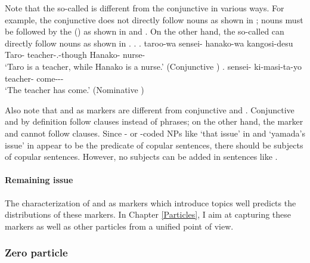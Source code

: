 Note that the so-called   is different from
the conjunctive  in various ways.
For example,
the conjunctive  does not directly follow nouns
as shown in \Last[a];
nouns must be followed by the  () as shown in \Last[a] and \Next[a].
On the other hand,
the so-called   can directly follow nouns
as shown in \Next[b].
%
\ex.
 \ag. taroo-wa sensei- hanako-wa kangosi-desu \\
      Taro- teacher-.-though Hanako- nurse- \\
      `Taro is a teacher, while Hanako is a nurse.'
      \hfill{(Conjunctive )}
 \bg. sensei- ki-masi-ta-yo \\
      teacher- come--- \\
      `The teacher has come.'
      \hfill{(Nominative )}


Also note that  and  as  markers are different from
conjunctive  and .
Conjunctive  and  by definition follow clauses
instead of phrases;
on the other hand,
the  marker  and  cannot follow clauses.
Since - or -coded NPs like  `that issue' in \LLast[a] and  `yamada's issue' in \LLast[b]
appear to be the predicate of copular sentences,
there should be subjects of copular sentences.
However, no subjects can be added in sentences like \LLast.

\paragraph{Remaining issue}

The characterization of  and  as  markers
which introduce topics well predicts the distributions of these markers.
In Chapter \ref{Particles},
I aim at capturing these markers as well as other  particles from a unified point of view.


\subsubsection{Zero particle}\label{BackSubSubZero}

